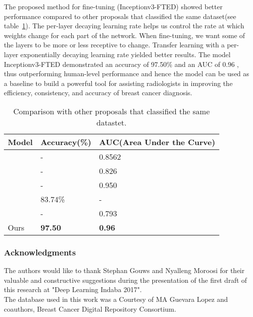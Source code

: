 \documentclass{article}
\begin{document}
The proposed method for fine-tuning (Inceptionv3-FTED) showed better performance compared to other proposals that classified the same dataset(see table~\ref{comp}).
The per-layer decaying learning rate helps us control the rate at which weights change for each part of the network. When fine-tuning, we want some of the layers to be more or less receptive to change. Transfer learning with a per-layer exponentially decaying learning rate yielded better results. 
The model Inceptionv3-FTED demonstrated an accuracy of 97.50\% and an AUC of 0.96 , thus outperforming human-level performance \citep{elmore2009variability} and hence the model can be used as a baseline to build a powerful tool for assisting radiologists in improving the efficiency, consistency, and accuracy of breast cancer diagnosis.

\begin{table}[h]
  \caption{Comparison with other proposals that classified the same datastet.}
  \label{comp}
  \centering
  \begin{tabular}{lll}
    \toprule          
    Model    				    & Accuracy(\%)  & AUC(Area Under the Curve)   \\
    \midrule
    \citep{perez2014improving}  		& -  		&0.8562     \\
    \citep{arevalo2016representation}& -  		&0.826      \\
    \citep{padillabreast}   		 	&-  			&0.950      \\
    \citep{jadoon2017three}          &83.74\%  	&-    	    \\
    \citep{perre2017lesion}   	    &-  			&0.793    	\\
     Ours   				& \textbf{97.50}			&\textbf{0.96}        \\
    \bottomrule
  \end{tabular}
\end{table}


\subsubsection*{Acknowledgments}
The authors would like to thank Stephan Gouws and Nyalleng Moroosi for their valuable and constructive suggestions during the presentation of the first draft of this research at "Deep Learning Indaba 2017".\\ 
The database used in this work was a Courtesy of MA Guevara Lopez and coauthors, Breast Cancer Digital Repository Consortium.

        

\end{document}
